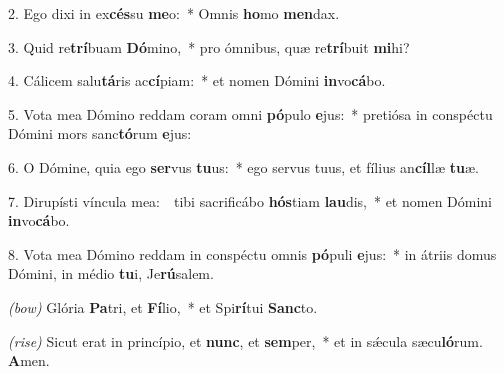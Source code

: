 2. Ego dixi in ex\textbf{cés}su \textbf{me}o:~* Omnis \textbf{ho}mo \textbf{men}dax.

3. Quid re\textbf{trí}buam \textbf{Dó}mino,~* pro ómnibus, quæ re\textbf{trí}buit \textbf{mi}hi?

4. Cálicem salu\textbf{tá}ris ac\textbf{cí}piam:~* et nomen Dómini \textbf{in}vo\textbf{cá}bo.

5. Vota mea Dómino reddam coram omni \textbf{pó}pulo \textbf{e}jus:~* pretiósa in conspéctu Dómini mors sanc\textbf{tó}rum \textbf{e}jus:

6. O Dómine, quia ego \textbf{ser}vus \textbf{tu}us:~* ego servus tuus, et fílius an\textbf{cíl}læ \textbf{tu}æ.

7. Dirupísti víncula mea:~\GreDagger\ tibi sacrificábo \textbf{hós}tiam \textbf{lau}dis,~* et nomen Dómini \textbf{in}vo\textbf{cá}bo.

8. Vota mea Dómino reddam in conspéctu omnis \textbf{pó}puli \textbf{e}jus:~* in átriis domus Dómini, in médio \textbf{tu}i, Je\textbf{rú}salem.

\textit{(bow)} Glória \textbf{Pa}tri, et \textbf{Fí}lio,~* et Spi\textbf{rí}tui \textbf{Sanc}to.

\textit{(rise)}  Sicut erat in princípio, et \textbf{nunc}, et \textbf{sem}per,~* et in s\'{\ae}cula sæcu\textbf{ló}rum. \textbf{A}men.